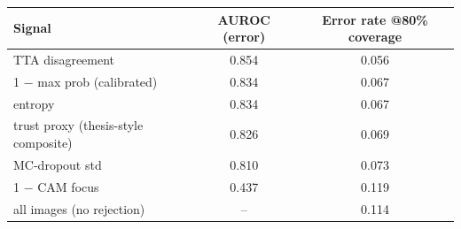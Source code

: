 \begin{tabular}{@{}lcc@{}}
\toprule
Signal & AUROC (error) & Error rate @80\% coverage \\
\midrule
TTA disagreement & 0.854 & 0.056 \\
1 $-$ max prob (calibrated) & 0.834 & 0.067 \\
entropy & 0.834 & 0.067 \\
trust proxy (thesis-style composite) & 0.826 & 0.069 \\
MC-dropout std & 0.810 & 0.073 \\
1 $-$ CAM focus & 0.437 & 0.119 \\
\midrule
all images (no rejection) & -- & 0.114 \\
\bottomrule
\end{tabular}